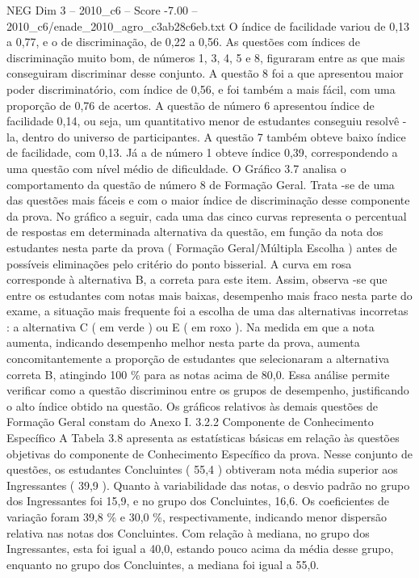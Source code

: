 \begin{textsample}{NEG Dim 3 – 2010\_c6 – Score -7.00 – 2010\_c6/enade\_2010\_agro\_c3ab28c6eb.txt}
O índice de facilidade variou de 0,13 a 0,77, e o de discriminação, de 0,22 a 0,56.
As questões com índices de discriminação muito bom, de números 1, 3, 4, 5 e 8, figuraram entre as que mais conseguiram discriminar desse conjunto.
A questão 8 foi a que apresentou maior poder discriminatório, com índice de 0,56, e foi também a mais fácil, com uma proporção de 0,76 de acertos.
A questão de número 6 apresentou índice de facilidade 0,14, ou seja, um quantitativo menor de estudantes conseguiu resolvê -la, dentro do universo de participantes.
A questão 7 também obteve baixo índice de facilidade, com 0,13.
Já a de número 1 obteve índice 0,39, correspondendo a uma questão com nível médio de dificuldade.
O Gráfico 3.7 analisa o comportamento da questão de número 8 de Formação Geral.
Trata -se de uma das questões mais fáceis e com o maior índice de discriminação desse componente da prova.
No gráfico a seguir, cada uma das cinco curvas representa o percentual de respostas em determinada alternativa da questão, em função da nota dos estudantes nesta parte da prova ( Formação Geral/Múltipla Escolha ) antes de possíveis eliminações pelo critério do ponto bisserial.
A curva em rosa corresponde à alternativa B, a correta para este item.
Assim, observa -se que entre os estudantes com notas mais baixas, desempenho mais fraco nesta parte do exame, a situação mais frequente foi a escolha de uma das alternativas incorretas : a alternativa C ( em verde ) ou E ( em roxo ).
Na medida em que a nota aumenta, indicando desempenho melhor nesta parte da prova, aumenta concomitantemente a proporção de estudantes que selecionaram a alternativa correta B, atingindo 100 \% para as notas acima de 80,0.
Essa análise permite verificar como a questão discriminou entre os grupos de desempenho, justificando o alto índice obtido na questão.
Os gráficos relativos às demais questões de Formação Geral constam do Anexo I. 3.2.2 Componente de Conhecimento Específico A Tabela 3.8 apresenta as estatísticas básicas em relação às questões objetivas do componente de Conhecimento Específico da prova.
Nesse conjunto de questões, os estudantes Concluintes ( 55,4 ) obtiveram nota média superior aos Ingressantes ( 39,9 ).
Quanto à variabilidade das notas, o desvio padrão no grupo dos Ingressantes foi 15,9, e no grupo dos Concluintes, 16,6.
Os coeficientes de variação foram 39,8 \% e 30,0 \%, respectivamente, indicando menor dispersão relativa nas notas dos Concluintes.
Com relação à mediana, no grupo dos Ingressantes, esta foi igual a 40,0, estando pouco acima da média desse grupo, enquanto no grupo dos Concluintes, a mediana foi igual a 55,0.

\end{textsample}
